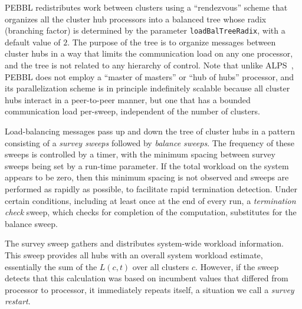 PEBBL redistributes work between clusters using a ``rendezvous''
scheme that organizes all the cluster hub processors into a balanced
tree whose radix (branching factor) is determined by the parameter
\texttt{loadBalTreeRadix}, with a default value of $2$.  The purpose
of the tree is to organize messages between cluster hubs in a way that
limits the communication load on any one processor, and the tree is not
related to any hierarchy of control.  Note that unlike ALPS~\cite{RLS04},
PEBBL does not employ a ``master of masters'' or ``hub of hubs''
processor, and its parallelization scheme is in principle indefinitely
scalable because all cluster hubs interact in a peer-to-peer manner,
but one that has a bounded communication load per-sweep, independent
of the number of clusters.

Load-balancing messages pass up and down the tree of cluster hubs in a
pattern consisting of a \emph{survey sweeps} followed by \emph{balance
  sweeps}.  The frequency of these sweeps is controlled by a timer,
with the minimum spacing between survey sweeps being set by a run-time
parameter.  If the total workload on the system appears to be zero,
then this minimum spacing is not observed and sweeps are performed as
rapidly as possible, to facilitate rapid termination detection.  Under
certain conditions, including at least once at the end of every run, a
{\em termination check} sweep, which checks for completion of the
computation, substitutes for the balance sweep.

The survey sweep gathers and distributes system-wide workload
information.  This sweep provides all hubs with an overall system
workload estimate, essentially the sum of the $L(c,t)$ over all
clusters $c$.  However, if the sweep detects that this calculation was
based on incumbent values that differed from processor to processor,
it immediately repeats itself, a situation we call a \emph{survey
  restart}.

